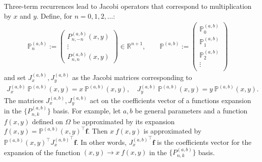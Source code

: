 \documentclass[11pt, oneside]{article}   	%
\newcommand{\R}{\mathbb{R}}
\newcommand{\bigP}{\mathbb{P}}
\newcommand{\Pnkab}{P_{n,k}^{(a,b)}}
\newcommand{\bigPab}{\bigP^{(a,b)}}
\begin{document}
Three-term recurrences lead to Jacobi operators that correspond to multiplication by $x$ and $y$. Define, for $n=0,1,2,\dots$: 
\begin{align}
\bigPab_n := \begin{pmatrix}
		P^{(a,b)}_{n,-n}(x,y) \\
		\vdots \\
		P^{(a,b)}_{n,n}(x,y)
	\end{pmatrix} \in \R^{n+1}, 
\quad \quad 
\bigPab := \begin{pmatrix}
		\bigPab_0 \\
		\bigPab_1 \\
		\bigPab_2 \\
		\vdots \\
	\end{pmatrix}
\end{align}
and set $J_x^{(a,b)}, J_y^{(a,b)}$ as the Jacobi matrices corresponding to
\begin{align}
J_x^{(a,b)} \: \bigPab(x,y) = x \: \bigPab(x,y), \quad J_y^{(a,b)} \: \bigPab(x,y) = y \: \bigPab(x,y).
\label{eqn:jacobimatricesdefinition}
\end{align}
The matrices $J_x^{(a,b)}, J_y^{(a,b)}$ act on the coefficients vector of a functions expansion in the $\{\Pnkab\}$ basis. For example, let $a, b$ be general parameters and a function $f(x,y)$ defined on $\Omega$ be approximated by its expansion $f(x,y) = \bigPab(x,y)^\top \mathbf{f}$. Then $x \: f(x,y)$ is approximated by $\bigPab(x,y)^\top {J_x^{(a,b)}}^\top \mathbf{f}$. In other words, ${J_x^{(a,b)}}^\top \mathbf{f}$ is the coefficients vector for the expansion of the function $(x,y) \to x \: f(x,y)$ in the  $\{\Pnkab\}$ basis.
\end{document}

